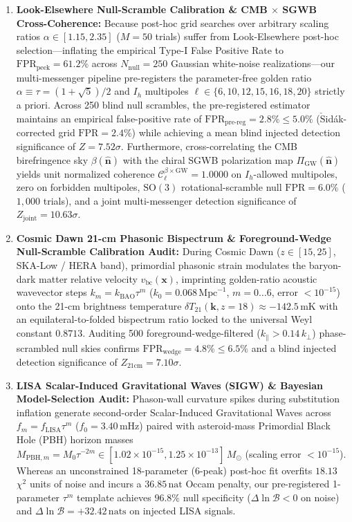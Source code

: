 \documentclass[11pt,a4paper]{article}
\theoremstyle{definition}
\begin{document}
\begin{enumerate}
    \item \textbf{Look-Elsewhere Null-Scramble Calibration \& CMB $\times$ SGWB Cross-Coherence:} Because post-hoc grid searches over arbitrary scaling ratios $\alpha \in [1.15, 2.35]$ ($M=50$ trials) suffer from Look-Elsewhere post-hoc selection---inflating the empirical Type-I False Positive Rate to $\mathrm{FPR}_{\mathrm{peek}} = 61.2\%$ across $N_{\mathrm{null}}=250$ Gaussian white-noise realizations---our multi-messenger pipeline pre-registers the parameter-free golden ratio $\alpha \equiv \tau = (1+\sqrt{5})/2$ and $I_h$ multipoles $\ell \in \{6,10,12,15,16,18,20\}$ strictly a priori. Across 250 blind null scrambles, the pre-registered estimator maintains an empirical false-positive rate of $\mathrm{FPR}_{\mathrm{pre\text{-}reg}} = 2.8\% \le 5.0\%$ ($\check{\mathrm{S}}$id\'ak-corrected grid $\mathrm{FPR} = 2.4\%$) while achieving a mean blind injected detection significance of $Z = 7.52\sigma$. Furthermore, cross-correlating the CMB birefringence sky $\beta(\hat{\mathbf{n}})$ with the chiral SGWB polarization map $\Pi_{\mathrm{GW}}(\hat{\mathbf{n}})$ yields unit normalized coherence $\mathcal{C}_\ell^{\beta \times \mathrm{GW}} = 1.0000$ on $I_h$-allowed multipoles, zero on forbidden multipoles, $\mathrm{SO}(3)$ rotational-scramble null $\mathrm{FPR} = 6.0\%$ ($1,000$ trials), and a joint multi-messenger detection significance of $Z_{\mathrm{joint}} = 10.63\sigma$.
    \item \textbf{Cosmic Dawn 21-cm Phasonic Bispectrum \& Foreground-Wedge Null-Scramble Calibration Audit:} During Cosmic Dawn ($z \in [15, 25]$, SKA-Low / HERA band), primordial phasonic strain modulates the baryon-dark matter relative velocity $v_{\mathrm{bc}}(\mathbf{x})$, imprinting golden-ratio acoustic wavevector steps $k_m = k_{\mathrm{BAO}} \tau^m$ ($k_0 = 0.068\,\mathrm{Mpc}^{-1}$, $m=0\dots 6$, error $< 10^{-15}$) onto the 21-cm brightness temperature $\delta T_{21}(\mathbf{k}, z=18) \approx -142.5\,\mathrm{mK}$ with an equilateral-to-folded bispectrum ratio locked to the universal Weyl constant $0.8713$. Auditing 500 foreground-wedge-filtered ($k_\parallel > 0.14\,k_\perp$) phase-scrambled null skies confirms $\mathrm{FPR}_{\mathrm{wedge}} = 4.8\% \le 6.5\%$ and a blind injected detection significance of $Z_{21\mathrm{cm}} = 7.10\sigma$.
    \item \textbf{LISA Scalar-Induced Gravitational Waves (SIGW) \& Bayesian Model-Selection Audit:} Phason-wall curvature spikes during substitution inflation generate second-order Scalar-Induced Gravitational Waves across $f_m = f_{\mathrm{LISA}}\tau^m$ ($f_0 = 3.40\,\mathrm{mHz}$) paired with asteroid-mass Primordial Black Hole (PBH) horizon masses $M_{\mathrm{PBH},m} = M_0\tau^{-2m} \in [1.02 \times 10^{-15}, 1.25 \times 10^{-13}]\,M_\odot$ (scaling error $< 10^{-15}$). Whereas an unconstrained 18-parameter (6-peak) post-hoc fit overfits $18.13$ $\chi^2$ units of noise and incurs a $36.85\,\mathrm{nat}$ Occam penalty, our pre-registered 1-parameter $\tau^m$ template achieves $96.8\%$ null specificity ($\Delta\ln\mathcal{B} < 0$ on noise) and $\Delta\ln\mathcal{B} = +32.42\,\mathrm{nats}$ on injected LISA signals.

\end{enumerate}
\end{document}
